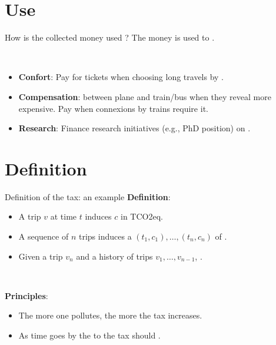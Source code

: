 \documentclass[french, english]{beamer}
\begin{document}
\section{Use}
\begin{frame}{How is the collected money used ?}
The money is used to .

\

\begin{itemize} 
    \item \textbf{Confort}: Pay for  tickets when choosing long travels by . 
    \item \textbf{Compensation}:  between plane and train/bus when they reveal more expensive.  Pay  when connexions by trains require it.
    \item \textbf{Research}: Finance research initiatives (e.g., PhD position) on .
\end{itemize}	
\end{frame}

\section{Definition}
\begin{frame}{Definition of the tax: an example}
\textbf{Definition}:
\begin{itemize}
\item A trip $v$ at time $t$ induces  $c$ in TCO2eq.
\item A sequence of $n$ trips induces a  $(t_1, c_1),\ldots,(t_n,c_n)$ of .
\item Given a trip $v_n$ and a history of trips $v_1,\ldots, v_{n-1}$, .  
\end{itemize}

\

\textbf{Principles}:
\begin{itemize}
\item The more one pollutes, the more the tax increases. 
\item As time goes by the  to the tax should .
\end{itemize}
\end{frame}
\end{document}
